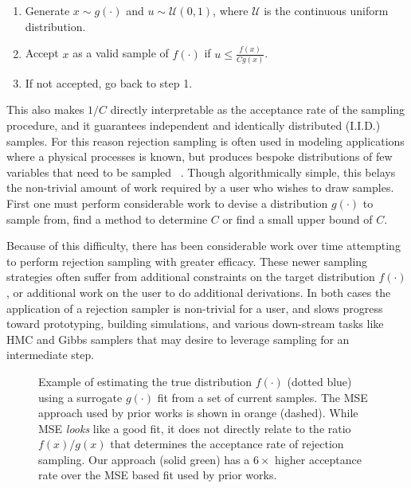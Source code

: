 \documentclass{ecai}  %
\begin{document}
\begin{enumerate}
\item  Generate $x \sim g(\cdot)$ and $u \sim \mathcal{U}(0, 1)$, where $\mathcal{U}$ is the continuous uniform distribution. 
\item Accept $x$ as a valid sample of $f(\cdot)$ if $u \leq \frac{f(x)}{C g(x)}$.
\item If not accepted, go back to step 1.  
\end{enumerate}

This also makes $1/C$ directly interpretable as the acceptance rate of the sampling procedure, and it guarantees independent and identically distributed (I.I.D.) samples. For this reason rejection sampling is often used in modeling applications where a physical processes is known, but produces bespoke distributions of few variables that need to be sampled ~\cite{kermiche_total_2022,ozols_quantum_2012,jewson_adjusting_2020,mitchell-wallace_natural_2017,nguyen_acceptance-rejection_2014,paskov_faster_1998,Jul2021}. Though algorithmically simple, this belays the non-trivial amount of work required by a user who wishes to draw samples. First one must perform considerable work to devise a distribution $g(\cdot)$ to sample from, find a method to determine $C$ or find a small upper bound of $C$. 

Because of this difficulty, there has been considerable work over time attempting to perform rejection sampling with greater efficacy. These newer sampling strategies often suffer from additional constraints on the target distribution $f(\cdot)$, or additional work on the user to do additional derivations. In both cases the application of a rejection sampler is non-trivial for a user, and slows progress toward prototyping, building simulations, and various down-stream tasks like HMC and Gibbs samplers that may desire to leverage sampling for an intermediate step. 

%
%
\begin{figure}[!t]
    \centering
    \caption{Example of estimating the true distribution $f(\cdot)$ (dotted blue) using a surrogate $g(\cdot)$ fit from a set of current samples. The MSE approach used by prior works is shown in orange (dashed).
    While MSE \textit{looks} like a good fit, it does not directly relate to the ratio $f(x)/g(x)$ that determines the acceptance rate of rejection sampling. Our approach (solid green) has a $6\times$ higher acceptance rate over the MSE based fit used by prior works.
    }
    \label{fig:example}
\end{figure}
%
\end{document}
